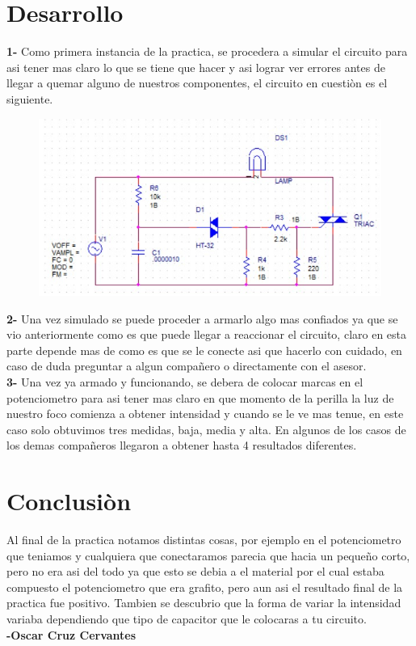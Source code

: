 \documentclass[12pt,a4paper]{article}
\begin{document}
\section{Desarrollo}
\textbf{1-} Como primera instancia de la practica, se procedera a simular el circuito para asi tener mas claro lo que se tiene que hacer y asi lograr ver errores antes de llegar a quemar alguno de nuestros componentes, el circuito en cuestiòn es el siguiente.
\begin{figure}[h!]
\centering
\includegraphics[scale=1]{01.jpeg}
\end{figure}

\textbf{2-} Una vez simulado se puede proceder a armarlo algo mas confiados ya que se vio anteriormente como es que puede llegar a reaccionar el circuito, claro en esta parte depende mas de como es que se le conecte asi que hacerlo con cuidado, en caso de duda preguntar a algun compañero o directamente con el asesor.\\

\textbf{3-} Una vez ya armado y funcionando, se debera de colocar marcas en el potenciometro para asi tener mas claro en que momento de la perilla la luz de nuestro foco comienza a obtener intensidad y cuando se le ve mas tenue, en este caso solo obtuvimos tres medidas, baja, media y alta. En algunos de los casos de los demas compañeros llegaron a obtener hasta 4 resultados diferentes.

\section{Conclusiòn}
Al final de la practica notamos distintas cosas, por ejemplo en el potenciometro que teniamos y cualquiera que conectaramos parecia que hacia un pequeño corto, pero no era asi del todo ya que esto se debia a el material por el cual estaba compuesto el potenciometro que era grafito, pero aun asi el resultado final de la practica fue positivo.
Tambien se descubrio que la forma de variar la intensidad variaba dependiendo que tipo de capacitor que le colocaras a tu circuito.\\
\textbf{-Oscar Cruz Cervantes}    
\end{document}
